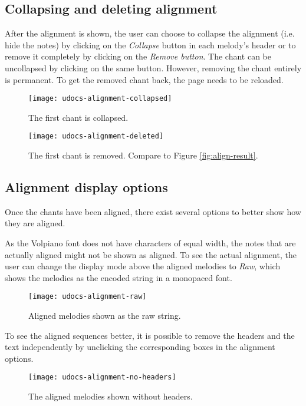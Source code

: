 \subsection{Collapsing and deleting alignment}

After the alignment is shown, the user can choose to collapse the alignment (i.e. hide the notes) by clicking on the \emph{Collapse} button
in each melody's header or to remove it completely by clicking on the \emph{Remove button}. The chant can be uncollapsed by clicking
on the same button. However, removing the chant entirely is permanent. To get the removed chant back, the page needs to be reloaded.

\begin{figure}[!h]
\centering
\texttt{[image: udocs-alignment-collapsed]}
\caption{The first chant is collapsed.}
\label{fig:align-collapsed}
\end{figure}

\begin{figure}[!h]
\centering
\texttt{[image: udocs-alignment-deleted]}
\caption{The first chant is removed. Compare to Figure \ref{fig:align-result}.}
\label{fig:align-removed}
\end{figure}

\subsection{Alignment display options}

Once the chants have been aligned, there exist several options to better show how they are aligned.

As the Volpiano font does not have characters of equal width, the notes that are actually aligned might not be shown as aligned. To see the
actual alignment, the user can change the display mode above the aligned melodies to \emph{Raw}, which shows the melodies as the encoded string
in a monopaced font.

\begin{figure}[!h]
\centering
\texttt{[image: udocs-alignment-raw]}
\caption{Aligned melodies shown as the raw string.}
\label{fig:align-raw}
\end{figure}

To see the aligned sequences better, it is possible to remove the headers and the text independently by unclicking the corresponding boxes
in the alignment options.

\begin{figure}[!h]
\centering
\texttt{[image: udocs-alignment-no-headers]}
\caption{The aligned melodies shown without headers.}
\label{fig:align-no-headers}
\end{figure}

